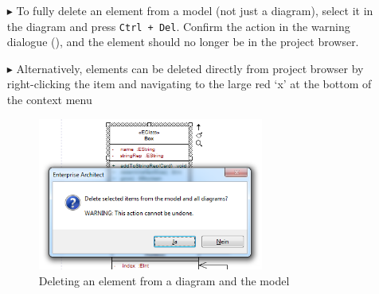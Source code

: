 \begin{itemize}
\item[$\blacktriangleright$] To fully delete an element from a model (not just a diagram), select it in the diagram and press \texttt{Ctrl + Del}. Confirm the
action in the warning dialogue (), and the element should no longer be in the project browser.

\vspace{0.5cm}

\item[$\blacktriangleright$] Alternatively, elements can be deleted directly from project browser by right-clicking the item and navigating to the large
red `x' at the bottom of the context menu

\begin{figure}[htbp]
\begin{center}
  \includegraphics[width=0.7\textwidth]{ea_deleteWarning}
  \caption{Deleting an element from a diagram and the model}  
  \label{ea:deleteWarning}
\end{center}
\end{figure}  

\end{itemize}

